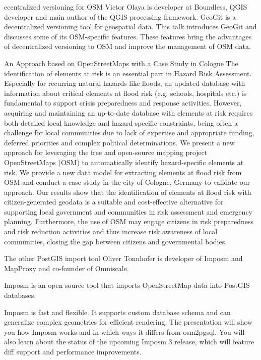 
%
{ecentralized versioning for OSM}%
{Victor Olaya is developer at Boundless, QGIS developer and main author of the QGIS processing framework.}%
{GeoGit is a decentralized versioning tool for geospatial data. This talk introduces GeoGit and discusses some of its OSM-specific features. These features bring the advantages of decentralized versioning to OSM and improve the management of OSM data.}

%
{An Approach based on OpenStreetMaps with a Case Study in Cologne}%
{}%
{The identification of elements at risk is an essential part in Hazard Risk Assessment. Especially for recurring natural hazards like floods, an updated database with information about critical elements at flood risk (e.g. schools, hospitals etc.) is fundamental to support crisis preparedness and response activities. However, acquiring and maintaining an up-to-date database with elements at risk requires both detailed local knowledge and hazard-specific constraints, being often a challenge for local communities due to lack of expertise and appropriate funding, deferred priorities and complex political determinations.
We present a new approach for leveraging the free and open-source mapping project OpenStreetMaps (OSM) to automatically identify hazard-specific elements at risk. We provide a new data model for extracting elements at flood risk from OSM and conduct a case study in the city of Cologne, Germany to validate our approach. Our results show that the identification of elements at flood risk with citizen-generated geodata is a suitable and cost-effective alternative for supporting local government and communities in risk assessment and emergency planning. Furthermore, the use of OSM may engage citizens in risk preparedness and risk reduction activities and thus increase risk awareness of local communities, closing the gap between citizens and governmental bodies.}

%
{The other PostGIS import tool}%
{Oliver Tonnhofer is developer of Imposm and MapProxy and co-founder of Omniscale.}%
{Imposm is an open source tool that imports OpenStreetMap data into PostGIS databases.

Imposm is fast and flexible. It supports custom database schema and can generalize complex geometries for efficient rendering.
The presentation will show you how Imposm works and in which ways it differs from osm2pgsql. You will also learn about the status of the upcoming Imposm 3 release, which will feature diff support and performance improvements.}

